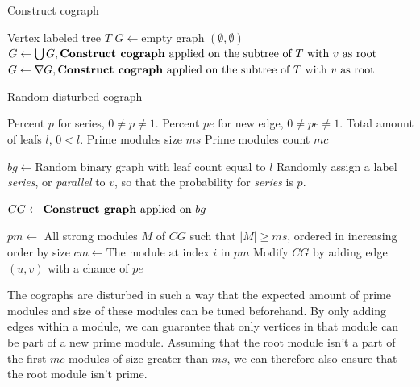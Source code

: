 \documentclass[a4paper]{article}
\begin{document}
\begin{algorithm}[H]
    \caption{Construct cograph}
    \label{alg:constructcograph}
   \begin{algorithmic}[1]
        \REQUIRE Vertex labeled tree $T$
        \ENDIF
        \STATE $G \leftarrow \text{empty graph $(\emptyset,\emptyset)$}$
                \STATE $G \leftarrow \bigcup G, \text{\textbf{Construct cograph} applied
                on the subtree of $T$ with $v$ as root} $
                \STATE $G \leftarrow \nabla G, \text{\textbf{Construct cograph} applied
                on the subtree of $T$ with $v$ as root}$
            \ENDIF
        \ENDFOR
    \end{algorithmic}
\end{algorithm}

\begin{algorithm}[H]
    \caption{Random disturbed cograph}
  \label{alg:RDCG}
  \begin{algorithmic}[1]
      \REQUIRE Percent $p$ for series, $0 \neq p \neq 1$.
      \REQUIRE Percent $pe$ for new  edge, $0 \neq pe \neq 1$.
      \REQUIRE Total amount of leafs $l$, $0 < l$.
      \REQUIRE Prime modules size $ms$
      \REQUIRE Prime modules count $mc$

      \STATE $bg \leftarrow \text{Random binary graph with leaf count equal to $l$}$
        \STATE Randomly assign a label  \textit{series}, or \textit{parallel} to $v$, so
        that the probability for \textit{series} is $p$.
      \ENDFOR

      \STATE $CG \leftarrow \text{\textbf{Construct graph} applied on $bg$}$

      \STATE $pm \leftarrow $ All strong modules $M$ of $CG$ such that $|M| \geq ms$, ordered in increasing order by size
        \STATE $cm \leftarrow \text{The module at index $i$ in $pm$}$
            \STATE Modify $CG$ by adding edge $(u,v)$ with a chance of $pe$
        \ENDFOR
      \ENDFOR
  \end{algorithmic}
\end{algorithm}

The cographs are disturbed in such a way that the expected amount of prime
modules and size of these modules can be tuned beforehand. By only adding edges
within a module, we can guarantee that only vertices in that module can be part
of a new prime module.  Assuming that the root module isn't a part of the first
$mc$ modules of size greater than $ms$, we can therefore also ensure that the
root module isn't prime.
\end{document}
